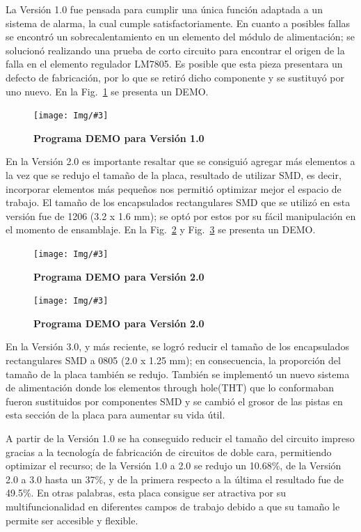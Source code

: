 \documentclass[times, 10pt,twocolumn]{article}
\newcommand{\Img}[5]{
   \begin{figure}[H]
   	   \centering
       \texttt{[image: Img/\#3]}
       \caption{ \centering \textbf{\small #4}}
       \label{#5}
   
       \end{figure}
   }
\begin{document}
La Versión 1.0 fue pensada para cumplir una única función adaptada a un sistema de alarma, la cual cumple satisfactoriamente. En cuanto a posibles fallas se encontró un sobrecalentamiento en un elemento del módulo de alimentación; se solucionó realizando una prueba de corto circuito para encontrar el origen de la falla en el elemento regulador LM7805. Es posible que esta pieza presentara un defecto de fabricación, por lo que se retiró dicho componente y se sustituyó por uno nuevo. En la Fig.~\ref{fig:12} se presenta un DEMO.
\Img{7.5cm}{7.0cm}{primera_version_demo}{Programa DEMO para Versión 1.0}{fig:12}
En la Versión 2.0 es importante resaltar que se consiguió agregar más elementos a la vez que se redujo el tamaño de la placa, resultado de utilizar SMD, es decir, incorporar elementos más pequeños nos permitió optimizar mejor el espacio de trabajo. El tamaño de los encapsulados rectangulares SMD que se utilizó en esta versión fue de 1206 (3.2 x 1.6
mm); se optó por estos por su fácil manipulación en el momento de ensamblaje. En la Fig.~\ref{fig:13} y Fig.~\ref{fig:14} se presenta un DEMO.
\Img{7.5cm}{7.0cm}{segunda_version_demoa}{Programa DEMO para Versión 2.0}{fig:13}
\Img{7.5cm}{7.0cm}{segunda_version_demob}{Programa DEMO para Versión 2.0}{fig:14}

En la Versión 3.0, y más reciente, se logró reducir el tamaño de los encapsulados rectangulares SMD a 0805 (2.0 x 1.25 mm); en consecuencia, la proporción del tamaño de la placa también se redujo. También se implementó un nuevo sistema de alimentación donde los elementos through hole(THT) que lo conformaban fueron sustituidos por componentes SMD y se cambió el grosor de las pistas en esta sección de la placa para aumentar su vida útil.

A partir de la Versión 1.0 se ha conseguido reducir el tamaño del circuito impreso gracias a la tecnología de fabricación de circuitos de doble cara, permitiendo optimizar el recurso; de la Versión 1.0 a 2.0 se redujo un 10.68\%, de la Versión 2.0 a 3.0 hasta un 37\%, y de la primera respecto a la última el resultado fue de 49.5\%. En otras palabras, esta placa consigue ser atractiva por su multifuncionalidad en diferentes campos de trabajo debido a que su tamaño le permite ser accesible y flexible.
 
\end{document}
